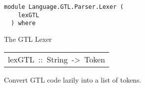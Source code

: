 \label{module:Language.GTL.Parser.Lexer}
\haddockbeginheader
{\haddockverb\begin{verbatim}
module Language.GTL.Parser.Lexer (
    lexGTL
  ) where\end{verbatim}}
\haddockendheader

The GTL Lexer  
\par

\begin{haddockdesc}
\item[\begin{tabular}{@{}l}
lexGTL\ ::\ String\ ->\ {\char 91}Token{\char 93}
\end{tabular}]\haddockbegindoc
Convert GTL code lazily into a list of tokens.
\par

\end{haddockdesc}